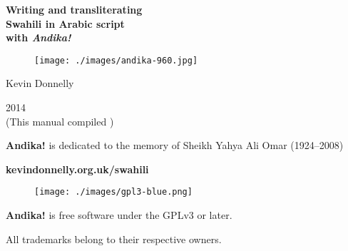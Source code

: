 \begin{titlepage}
\begin{center}

{\Huge\textbf{Writing and transliterating}}\\[0.5cm]
{\Huge\textbf{Swahili in Arabic script}}\\[0.5cm]
{\Huge\textbf{with \textit{Andika!}}}

\vspace{2cm}

\begin{figure}[h]
 \centering
 \texttt{[image: ./images/andika-960.jpg]}
\end{figure}
\vspace{2cm}


{\LARGE{Kevin Donnelly}}
\vspace{1.5cm}

{\Large{2014}}\\
(This manual compiled \todayuk)

\vspace{1.5cm}
\textbf{Andika!} is dedicated to the memory of Sheikh Yahya Ali Omar (1924--2008)\\

\textbf{kevindonnelly.org.uk/swahili}
\begin{figure}[H]
 \centering
 \texttt{[image: ./images/gpl3-blue.png]}
\end{figure}

\textbf{Andika!} is free software under the GPLv3 or later.

All trademarks belong to their respective owners.

\end{center}
\end{titlepage}


\tableofcontents  %
\listoffigures
\listoftables

